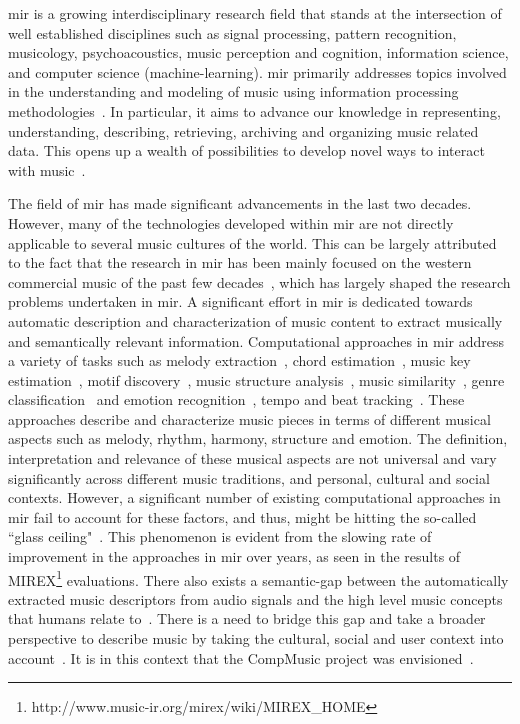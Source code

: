 \Gls{mir} is a growing interdisciplinary research field that stands at the intersection of well established disciplines such as signal processing, pattern recognition, musicology, psychoacoustics, music perception and cognition, information science, and computer science (machine-learning). \Gls{mir} primarily addresses topics involved in the understanding and modeling of music using information processing methodologies~\citep{roadmap_mir}. In particular, it aims to advance our knowledge in representing, understanding, describing, retrieving, archiving and organizing music related data. This opens up a wealth of possibilities to develop novel ways to interact with music~\citep{casey2008content,orio2006music,burgoyne2016music}. 


The field of \gls{mir} has made significant advancements in the last two decades. However, many of the technologies developed within \gls{mir} are not directly applicable to several music cultures of the world. This can be largely attributed to the fact that the research in \gls{mir} has been mainly focused on the western commercial music of the past few decades~\citep{XavierSerra2011}, which has largely shaped the research problems undertaken in \gls{mir}. A significant effort in \gls{mir} is dedicated towards automatic description and characterization of music content to extract musically and semantically relevant information. Computational approaches in \gls{mir} address a variety of tasks such as melody extraction~\citep{salamon:phd:13}, chord estimation~\citep{mcvicar2014automatic}, music key estimation~\citep{peeters2006chroma}, motif discovery~\citep{collins2011improved,Conklin2010}, music structure analysis~\citep{paulus2010state,serra2012unsupervised}, music similarity~\citep{joan_thesis}, genre classification~\cite{aucouturier2003representing} and emotion recognition~\citep{kim2010music}, tempo and beat tracking~\citep{gouyon2005review,scheirer1998tempo}. These approaches describe and characterize music pieces in terms of different musical aspects such as melody, rhythm, harmony, structure and emotion. The definition, interpretation and relevance of these musical aspects are not universal and vary significantly across different music traditions,  and personal, cultural and social contexts. However, a significant number of existing computational approaches in \gls{mir} fail to account for these factors, and thus, might be hitting the so-called ``glass ceiling"~\citep{pachet2004improving,casey2008content}. This phenomenon is evident from the slowing rate of improvement in the approaches in \gls{mir} over years, as seen in the results of MIREX\footnote{http://www.music-ir.org/mirex/wiki/MIREX\_HOME} evaluations. There also exists a semantic-gap between the automatically extracted music descriptors from audio signals and the high level music concepts that humans relate to~\citep{celma2006foafing,casey2008content}. There is a need to bridge this gap and take a broader perspective to describe music by taking the cultural, social and user context into account~\citep{roadmap_mir}. It is in this context that the CompMusic project was envisioned~\citep{XavierSerra2011}.

